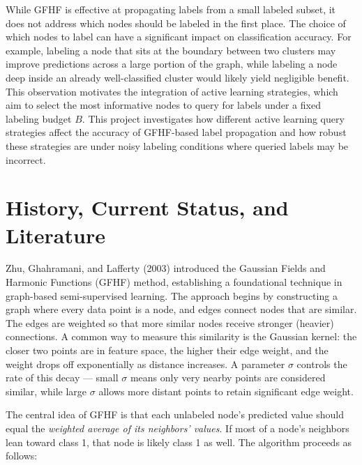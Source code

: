 \documentclass{article}
\begin{document}
While GFHF is effective at propagating labels from a small labeled subset, it does not address which nodes should be labeled in the first place. The choice of which nodes to label can have a significant impact on classification accuracy. For example, labeling a node that sits at the boundary between two clusters may improve predictions across a large portion of the graph, while labeling a node deep inside an already well-classified cluster would likely yield negligible benefit. This observation motivates the integration of active learning strategies, which aim to select the most informative nodes to query for labels under a fixed labeling budget $B$. This project investigates how different active learning query strategies affect the accuracy of GFHF-based label propagation and how robust these strategies are under noisy labeling conditions where queried labels may be incorrect.

\section{History, Current Status, and Literature}

Zhu, Ghahramani, and Lafferty (2003) introduced the Gaussian Fields and Harmonic Functions (GFHF) method, establishing a foundational technique in graph-based semi-supervised learning. The approach begins by constructing a graph where every data point is a node, and edges connect nodes that are similar. The edges are weighted so that more similar nodes receive stronger (heavier) connections. A common way to measure this similarity is the Gaussian kernel: the closer two points are in feature space, the higher their edge weight, and the weight drops off exponentially as distance increases. A parameter $\sigma$ controls the rate of this decay --- small $\sigma$ means only very nearby points are considered similar, while large $\sigma$ allows more distant points to retain significant edge weight.

The central idea of GFHF is that each unlabeled node's predicted value should equal the \textit{weighted average of its neighbors' values}. If most of a node's neighbors lean toward class 1, that node is likely class 1 as well. The algorithm proceeds as follows:
\end{document}
